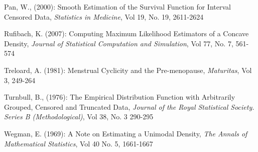 \documentclass[12pt]{article}
\numberwithin{equation}{section}
\begin{document}
\vspace{3mm}

Pan, W., (2000): Smooth Estimation of the Survival Function for Interval Censored Data, \emph{Statistics in Medicine}, Vol 19, No. 19, 2611-2624

\vspace{3mm}

Rufibach, K. (2007): Computing Maximum Likelihood Estimators of a Concave Density, \emph{Journal of Statistical Computation and Simulation}, Vol 77, No. 7, 561-574

\vspace{3mm}

Treloard, A. (1981): Menstrual Cyclicity and the Pre-menopause, \emph{Maturitas}, Vol 3, 249-264

\vspace{3mm}

Turnbull, B., (1976): The Empirical Distribution Function with Arbitrarily Grouped, Censored and Truncated Data, \emph{Journal of the Royal Statistical Society. Series B (Methodological)}, Vol 38, No. 3 290-295

\vspace{3mm}

Wegman, E. (1969): A Note on Estimating a Unimodal Density, \emph{The Annals of Mathematical Statistics}, Vol 40 No. 5, 1661-1667

\vspace{3mm}


	
	 
\end{document}

